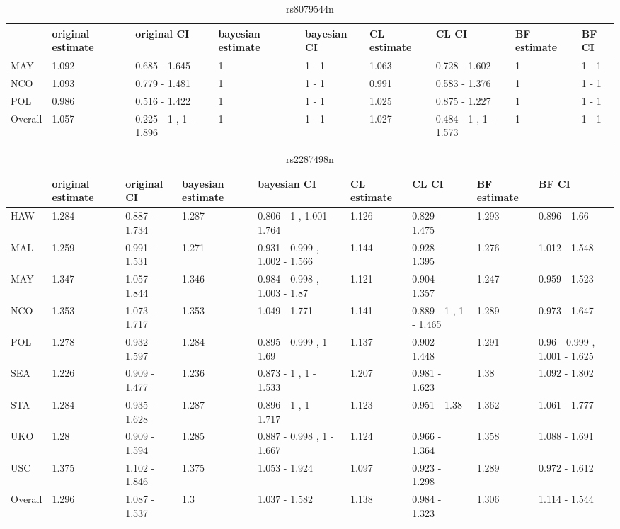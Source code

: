 \documentclass[AMA,STIX1COL]{WileyNJD-v2}\usepackage[]{graphicx}\usepackage[]{color}
\begin{document}
\begin{table}

\caption{\label{tab:unnamed-chunk-39}rs8079544n}
\centering
\begin{tabular}[t]{l|l|l|l|l|l|l|l|l}
\hline
  & original estimate & original CI & bayesian estimate & bayesian CI & CL estimate & CL CI & BF estimate & BF CI\\
\hline
MAY & 1.092 & 0.685 - 1.645 & 1 & 1 - 1 & 1.063 & 0.728 - 1.602 & 1 & 1 - 1\\
\hline
NCO & 1.093 & 0.779 - 1.481 & 1 & 1 - 1 & 0.991 & 0.583 - 1.376 & 1 & 1 - 1\\
\hline
POL & 0.986 & 0.516 - 1.422 & 1 & 1 - 1 & 1.025 & 0.875 - 1.227 & 1 & 1 - 1\\
\hline
Overall & 1.057 & 0.225 - 1 ,  1 - 1.896 & 1 & 1 - 1 & 1.027 & 0.484 - 1 ,  1 - 1.573 & 1 & 1 - 1\\
\hline
\end{tabular}
\end{table}
\begin{table}

\caption{\label{tab:unnamed-chunk-39}rs2287498n}
\centering
\begin{tabular}[t]{l|l|l|l|l|l|l|l|l}
\hline
  & original estimate & original CI & bayesian estimate & bayesian CI & CL estimate & CL CI & BF estimate & BF CI\\
\hline
HAW & 1.284 & 0.887 - 1.734 & 1.287 & 0.806 - 1 ,  1.001 - 1.764 & 1.126 & 0.829 - 1.475 & 1.293 & 0.896 - 1.66\\
\hline
MAL & 1.259 & 0.991 - 1.531 & 1.271 & 0.931 - 0.999 ,  1.002 - 1.566 & 1.144 & 0.928 - 1.395 & 1.276 & 1.012 - 1.548\\
\hline
MAY & 1.347 & 1.057 - 1.844 & 1.346 & 0.984 - 0.998 ,  1.003 - 1.87 & 1.121 & 0.904 - 1.357 & 1.247 & 0.959 - 1.523\\
\hline
NCO & 1.353 & 1.073 - 1.717 & 1.353 & 1.049 - 1.771 & 1.141 & 0.889 - 1 ,  1 - 1.465 & 1.289 & 0.973 - 1.647\\
\hline
POL & 1.278 & 0.932 - 1.597 & 1.284 & 0.895 - 0.999 ,  1 - 1.69 & 1.137 & 0.902 - 1.448 & 1.291 & 0.96 - 0.999 ,  1.001 - 1.625\\
\hline
SEA & 1.226 & 0.909 - 1.477 & 1.236 & 0.873 - 1 ,  1 - 1.533 & 1.207 & 0.981 - 1.623 & 1.38 & 1.092 - 1.802\\
\hline
STA & 1.284 & 0.935 - 1.628 & 1.287 & 0.896 - 1 ,  1 - 1.717 & 1.123 & 0.951 - 1.38 & 1.362 & 1.061 - 1.777\\
\hline
UKO & 1.28 & 0.909 - 1.594 & 1.285 & 0.887 - 0.998 ,  1 - 1.667 & 1.124 & 0.966 - 1.364 & 1.358 & 1.088 - 1.691\\
\hline
USC & 1.375 & 1.102 - 1.846 & 1.375 & 1.053 - 1.924 & 1.097 & 0.923 - 1.298 & 1.289 & 0.972 - 1.612\\
\hline
Overall & 1.296 & 1.087 - 1.537 & 1.3 & 1.037 - 1.582 & 1.138 & 0.984 - 1.323 & 1.306 & 1.114 - 1.544\\
\hline
\end{tabular}
\end{table}
\end{document}
